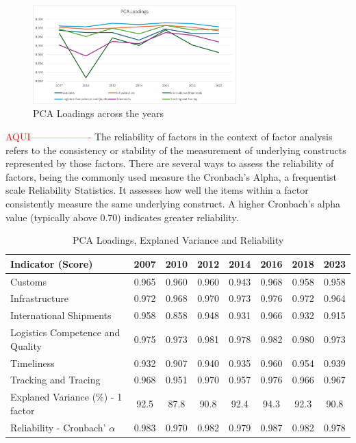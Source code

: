 \documentclass[sigconf]{acmart}
\begin{document}
\begin{figure}
    \centering
    \includegraphics[width=0.7\textwidth]{Loadings.png}
    \caption{PCA Loadings across the years}
    \label{fig:PCAl}
\end{figure}

\textcolor{red}{AQUI-------------------}
The reliability of factors in the context of factor analysis refers to the consistency or stability of the measurement of underlying constructs represented by those factors. There are several ways to assess the reliability of factors, being the commonly used measure the Cronbach's Alpha, a frequentist scale Reliability Statistics. It assesses how well the items within a factor consistently measure the same underlying construct. A higher Cronbach's alpha value (typically above 0.70) indicates greater reliability.
%


\begin{table}[h]
  \caption{PCA Loadings, Explaned Variance and Reliability}
  \label{tab:loadings}
\begin{tabular}{lccccccc}
\toprule
\textbf{Indicator (Score)}	&	\textbf{2007}	&	\textbf{2010}	&	\textbf{2012}	&	\textbf{2014}	&	\textbf{2016}	&	\textbf{2018}	&	\textbf{2023}	\\  
\midrule
Customs	&	0.965	&	0.960	&	0.960	&	0.943	&	0.968	&	0.958	&	0.958	\\	
Infrastructure	&	0.972	&	0.968	&	0.970	&	0.973	&	0.976	&	0.972	&	0.964	\\	
International Shipments	&	0.958	&	0.858	&	0.948	&	0.931	&	0.966	&	0.932	&	0.915	\\	
Logistics Competence and Quality	&	0.975	&	0.973	&	0.981	&	0.978	&	0.982	&	0.980	&	0.973	\\	
Timeliness	&	0.932	&	0.907	&	0.940	&	0.935	&	0.960	&	0.954	&	0.939	\\	
Tracking and Tracing	&	0.968	&	0.951	&	0.970	&	0.957	&	0.976	&	0.966	&	0.967	\\	\midrule
Explaned Variance (\%) - 1 factor 	&	92.5	&	87.8	&	90.8	&	92.4	&	94.3	&	92.3	&	90.8	\\	\midrule
Reliability - Cronbach' $\alpha$	&	0.983	&	0.970	&	0.982	&	0.979	&	0.987	&	0.982	&	0.978	\\	\bottomrule
\end{tabular}
\end{table}
\end{document}
